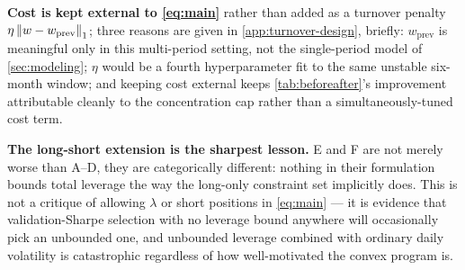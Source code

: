 \textbf{Cost is kept external to \cref{eq:main}} rather than added as a turnover penalty
$\eta\left\lVert w-w_{\text{prev}} \right\rVert_1$; three reasons are given in \cref{app:turnover-design}, briefly:
$w_{\text{prev}}$ is meaningful only in this multi-period setting, not the single-period model of
\cref{sec:modeling}; $\eta$ would be a fourth hyperparameter fit to the same unstable six-month
window; and keeping cost external keeps \cref{tab:beforeafter}'s improvement attributable cleanly
to the concentration cap rather than a simultaneously-tuned cost term.

\textbf{The long-short extension is the sharpest lesson.} E and F are not merely worse than A--D,
they are categorically different: nothing in their formulation bounds total leverage the way the
long-only constraint set implicitly does. This is not a critique of allowing $\lambda$ or short
positions in \cref{eq:main} --- it is evidence that validation-Sharpe selection with no leverage
bound anywhere will occasionally pick an unbounded one, and unbounded leverage combined with
ordinary daily volatility is catastrophic regardless of how well-motivated the convex program is.
